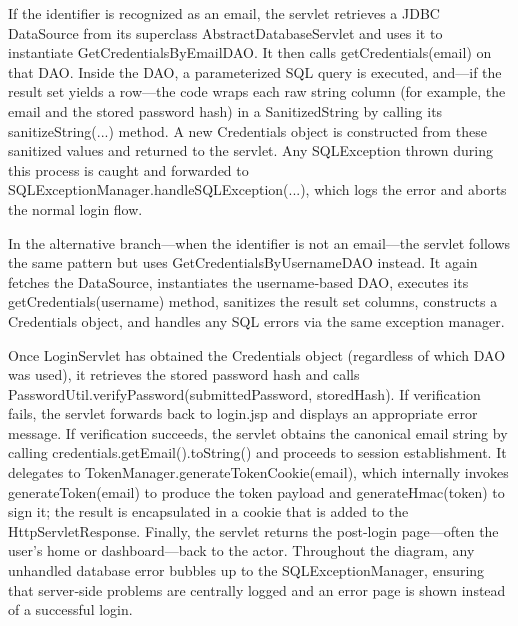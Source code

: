 If the identifier is recognized as an email, the servlet retrieves a JDBC DataSource from its superclass AbstractDatabaseServlet and uses it to instantiate GetCredentialsByEmailDAO. It then calls getCredentials(email) on that DAO. Inside the DAO, a parameterized SQL query is executed, and—if the result set yields a row—the code wraps each raw string column (for example, the email and the stored password hash) in a SanitizedString by calling its sanitizeString(...) method. A new Credentials object is constructed from these sanitized values and returned to the servlet. Any SQLException thrown during this process is caught and forwarded to SQLExceptionManager.handleSQLException(...), which logs the error and aborts the normal login flow.

In the alternative branch—when the identifier is not an email—the servlet follows the same pattern but uses GetCredentialsByUsernameDAO instead. It again fetches the DataSource, instantiates the username‐based DAO, executes its getCredentials(username) method, sanitizes the result set columns, constructs a Credentials object, and handles any SQL errors via the same exception manager.

Once LoginServlet has obtained the Credentials object (regardless of which DAO was used), it retrieves the stored password hash and calls PasswordUtil.verifyPassword(submittedPassword, storedHash). If verification fails, the servlet forwards back to login.jsp and displays an appropriate error message. If verification succeeds, the servlet obtains the canonical email string by calling credentials.getEmail().toString() and proceeds to session establishment. It delegates to TokenManager.generateTokenCookie(email), which internally invokes generateToken(email) to produce the token payload and generateHmac(token) to sign it; the result is encapsulated in a cookie that is added to the HttpServletResponse. Finally, the servlet returns the post‑login page—often the user’s home or dashboard—back to the actor. Throughout the diagram, any unhandled database error bubbles up to the SQLExceptionManager, ensuring that server‑side problems are centrally logged and an error page is shown instead of a successful login.


